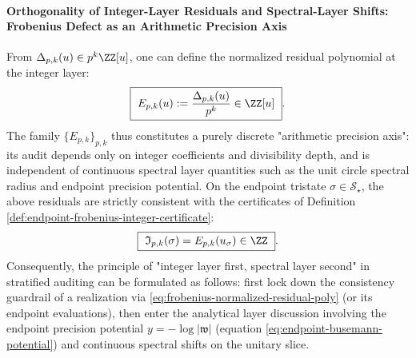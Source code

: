 \paragraph{Orthogonality of Integer-Layer Residuals and Spectral-Layer Shifts: Frobenius Defect as an Arithmetic Precision Axis}
From \(\Delta_{p,k}(u)\in p^k\ZZ[u]\), one can define the normalized residual polynomial at the integer layer:
\begin{equation}\label{eq:frobenius-normalized-residual-poly}
\boxed{\ E_{p,k}(u):=\frac{\Delta_{p,k}(u)}{p^{k}}\in\ZZ[u]\ }.
\end{equation}
The family \(\{E_{p,k}\}_{p,k}\) thus constitutes a purely discrete "arithmetic precision axis": its audit depends only on integer coefficients and divisibility depth, and is independent of continuous spectral layer quantities such as the unit circle spectral radius and endpoint precision potential.
On the endpoint tristate \(\sigma\in\mathcal S_{\star}\), the above residuals are strictly consistent with the certificates of Definition \ref{def:endpoint-frobenius-integer-certificate}:
\[
\boxed{\ \mathfrak I_{p,k}(\sigma)=E_{p,k}(u_\sigma)\in\ZZ\ }.
\]
Consequently, the principle of "integer layer first, spectral layer second" in stratified auditing can be formulated as follows: first lock down the consistency guardrail of a realization via \eqref{eq:frobenius-normalized-residual-poly} (or its endpoint evaluations),
then enter the analytical layer discussion involving the endpoint precision potential \(y=-\log|\mathfrak{w}|\) (equation \eqref{eq:endpoint-busemann-potential}) and continuous spectral shifts on the unitary slice.


